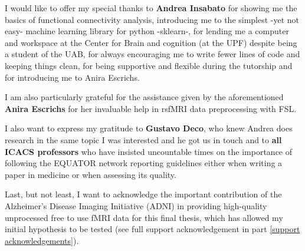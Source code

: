 \documentclass[a4paper,12pt]{elsarticle}  %
\begin{document}
\begin{titlepage}
	\thispagestyle{empty}
	
	\pagebreak
	\hspace{0pt}
	\vfill
			I would like to offer my special thanks to \textbf{Andrea Insabato} for showing me the basics of functional connectivity analysis, introducing me to the simplest -yet not easy- machine learning library for python -sklearn-, for lending me a computer and workspace at the Center for Brain and cognition (at the UPF) despite being a student of the UAB, for always encouraging me to write fewer lines of code and keeping things clean, for being supportive and flexible during the tutorship and for introducing me to Anira Escrichs.
			
			I am also particularly grateful for the assistance given by
			the aforementioned \textbf{Anira Escrichs} for her invaluable help in rsfMRI data preprocessing with FSL.
			
			I also want to express my gratitude to \textbf{Gustavo Deco}, who knew Andrea does research in the same topic I was interested and he got us in touch and to \textbf{all ICACS professors} who have insisted uncountable times on the importance of following the EQUATOR network reporting guidelines either when writing a paper in medicine or when assessing its quality.
			
			Last, but not least, I want to acknowledge the important contribution of the Alzheimer's Disease Imaging Initiative (ADNI) in providing high-quality unprocessed free to use fMRI data for this final thesis, which has allowed my initial hypothesis to be tested (see full support acknowledgement in part \ref{support acknowledgements}).
	\vfill
	\hspace{0pt}
	\pagebreak
	
\end{titlepage}
\end{document}
